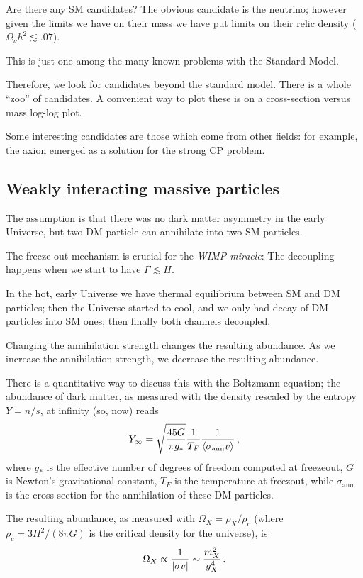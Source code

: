 \documentclass[main.tex]{subfiles}
\begin{document}
Are there any SM candidates? 
The obvious candidate is the neutrino; however given the limits we have on their mass 
we have put limits on their relic density (\(\Omega_\nu h^2 \lesssim \num{.07}\)). 

This is just one among the many known problems with the Standard Model. 

Therefore, we look for candidates beyond the standard model. 
There is a whole ``zoo'' of candidates. 
A convenient way to plot these is on a cross-section versus mass log-log plot.

Some interesting candidates are those which come from other fields: 
for example, the axion emerged as a solution for the strong CP problem. 

\subsection{Weakly interacting massive particles}

The assumption is that there was no dark matter asymmetry in the early Universe,
but two DM particle can annihilate into two SM particles. 

The freeze-out mechanism is crucial for the \emph{WIMP miracle}: 
The decoupling happens when we start to have \(\Gamma \lesssim H\). 

In the hot, early Universe we have thermal equilibrium between SM and DM particles;
then the Universe started to cool, and we only had decay of DM particles into SM ones;
then finally both channels decoupled. 

Changing the annihilation strength changes the resulting abundance. 
As we increase the annihilation strength, we decrease the resulting abundance.

There is a quantitative way to discuss this with the Boltzmann equation; the abundance of dark matter, as measured with the density rescaled by the entropy \(Y = n / s\), at infinity (so, now) reads 
%
\begin{align}
Y_{\infty } = \sqrt{\frac{45 G}{\pi g_*}} \frac{1}{T_F} \frac{1}{\expval{\sigma _{\text{ann}} v}}
\,,
\end{align}
%
where \(g_*\) is the effective number of degrees of freedom computed at freezeout, \(G\) is Newton's gravitational constant, \(T_F\) is the temperature at freezout, while \(\sigma _{\text{ann}}\) is the cross-section for the annihilation of these DM particles. 


The resulting abundance, as measured with \(\Omega _X = \rho _X / \rho _c\) (where \(\rho _c = 3 H^2 / (8 \pi G)\) is the critical density for the universe), is 
%
\begin{align}
\Omega_X \propto \frac{1}{\abs{\sigma v}} \sim \frac{m_X^2}{g_X^{4}}
\,.
\end{align}
\end{document}
